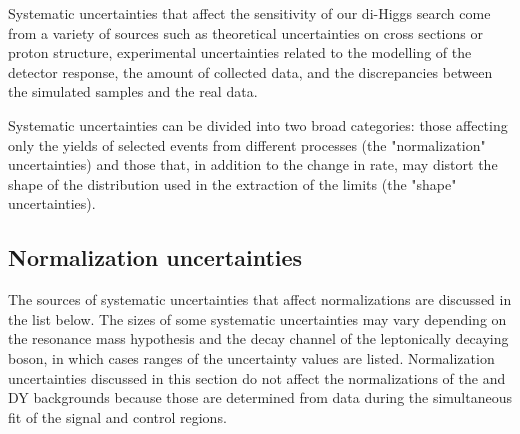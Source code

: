 Systematic uncertainties that affect the sensitivity of our di-Higgs search
come from a variety of sources such as theoretical uncertainties on
cross sections or proton structure, experimental uncertainties related
to the modelling of the detector response, the amount of collected
data, and the discrepancies between the simulated samples and the real data.

Systematic uncertainties can be divided into two broad categories:
those affecting only the yields of selected events from different processes
(the "normalization" uncertainties) and those that, in addition to the change in rate, may
distort the shape of the \mTHH distribution used in the extraction of
the limits (the "shape" uncertainties). %

\subsection{Normalization uncertainties}


The sources of systematic
uncertainties that affect normalizations are discussed in the list below. The sizes of some
systematic uncertainties may vary depending on the resonance mass hypothesis
and the decay channel of the leptonically decaying \PZ boson, in which cases
ranges of the uncertainty values are listed. Normalization uncertainties
discussed in this section do not affect the normalizations of the \ttbar and DY
backgrounds because those are determined from data during the simultaneous fit of the signal and control regions.

